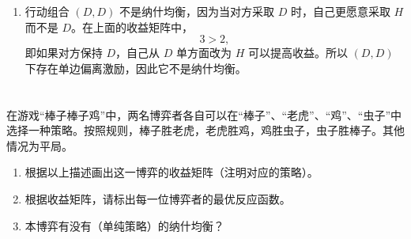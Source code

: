 \documentclass[12pt,a4paper]{article}
\begin{document}
\begin{enumerate}[label=\alph*.]
  \item
  行动组合 \((D,D)\) 不是纳什均衡，因为当对方采取 \(D\) 时，自己更愿意采取 \(H\) 而不是 \(D\)。在上面的收益矩阵中，
  \[
  3>2,
  \]
  即如果对方保持 \(D\)，自己从 \(D\) 单方面改为 \(H\) 可以提高收益。所以 \((D,D)\) 下存在单边偏离激励，因此它不是纳什均衡。
\end{enumerate}

\section{}
在游戏``棒子棒子鸡''中，两名博弈者各自可以在``棒子''、``老虎''、``鸡''、``虫子''中选择一种策略。按照规则，棒子胜老虎，老虎胜鸡，鸡胜虫子，虫子胜棒子。其他情况为平局。

\begin{enumerate}[label=\alph*.]
  \item 根据以上描述画出这一博弈的收益矩阵（注明对应的策略）。
  \item 根据收益矩阵，请标出每一位博弈者的最优反应函数。
  \item 本博弈有没有（单纯策略）的纳什均衡？
\end{enumerate}

\vspace{0.5cm}
\end{document}
